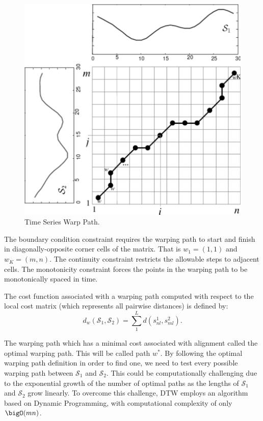 \begin{figure}[htb]
	\centering
	\includegraphics[scale=0.5]{../Figures/DTW-WarpPath}
	\caption{Time Series Warp Path.}
	\label{Fig:DTW_warp_path}
\end{figure}

The boundary condition constraint requires the warping path to start and finish in diagonally-opposite corner cells of the matrix. That is $w_{1} = (1, 1)$ and $w_{K} = (m, n)$. The continuity constraint restricts the allowable steps to adjacent cells. The monotonicity constraint forces the points in the warping path to be monotonically spaced in time. 

The cost function associated with a warping path computed with respect to the local cost matrix (which represents all pairwise distances) is defined by: 
\begin{equation}
    d_{w}\left(\mathcal{S}_{1}, \mathcal{S}_{2}\right) = \sum_{1}^{L} d(s^{1}_{nl}, s^{2}_{ml}).
\end{equation}

The warping path which has a minimal cost associated with alignment called the optimal warping path.  This will be called path $w^{*}$. By following the optimal warping path definition in order to find one, we need to test every possible warping path between $\mathcal{S}_{1}$ and $\mathcal{S}_{2}$. This could be computationally challenging due to the exponential growth of the number of optimal paths as the lengths of $\mathcal{S}_{1}$ and $\mathcal{S}_{2}$ grow linearly. To overcome this challenge, DTW employs an algorithm based on Dynamic Programming, with computational complexity of only $\bigO(mn)$.

